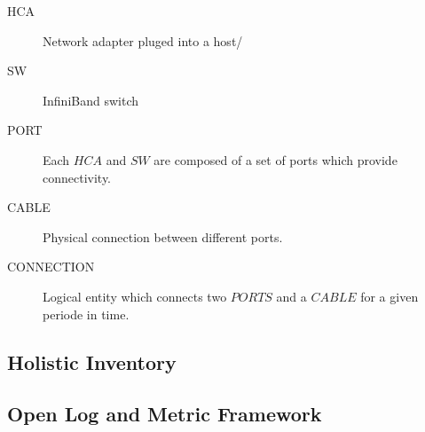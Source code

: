 \begin{description}
    \item[HCA] Network adapter pluged into a host/
    \item[SW] InfiniBand switch
    \item[PORT] Each $HCA$ and $SW$ are composed of a set of ports which provide connectivity.
    \item[CABLE] Physical connection between different ports.
    \item[CONNECTION] Logical entity which connects two $PORTS$ and a $CABLE$ for a given periode in time.
\end{description}


\subsection{Holistic Inventory}


\subsection{Open Log and Metric Framework}